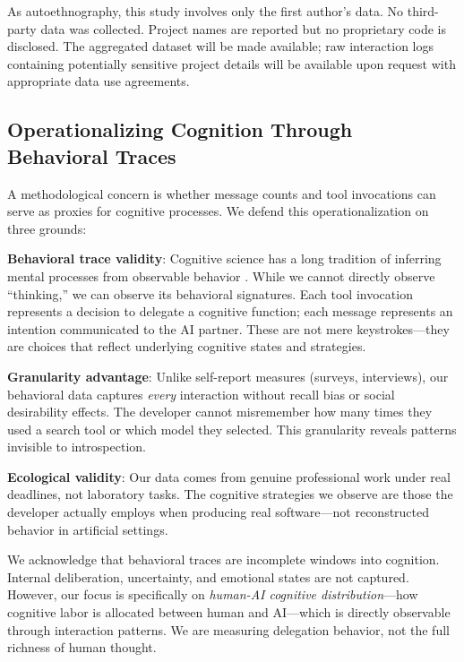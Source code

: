 As autoethnography, this study involves only the first author's data. No third-party data was collected. Project names are reported but no proprietary code is disclosed. The aggregated dataset will be made available; raw interaction logs containing potentially sensitive project details will be available upon request with appropriate data use agreements.

\subsection{Operationalizing Cognition Through Behavioral Traces}

A methodological concern is whether message counts and tool invocations can serve as proxies for cognitive processes. We defend this operationalization on three grounds:

\textbf{Behavioral trace validity}: Cognitive science has a long tradition of inferring mental processes from observable behavior \cite{letovsky1987cognitive}. While we cannot directly observe ``thinking,'' we can observe its behavioral signatures. Each tool invocation represents a decision to delegate a cognitive function; each message represents an intention communicated to the AI partner. These are not mere keystrokes---they are choices that reflect underlying cognitive states and strategies.

\textbf{Granularity advantage}: Unlike self-report measures (surveys, interviews), our behavioral data captures \textit{every} interaction without recall bias or social desirability effects. The developer cannot misremember how many times they used a search tool or which model they selected. This granularity reveals patterns invisible to introspection.

\textbf{Ecological validity}: Our data comes from genuine professional work under real deadlines, not laboratory tasks. The cognitive strategies we observe are those the developer actually employs when producing real software---not reconstructed behavior in artificial settings.

We acknowledge that behavioral traces are incomplete windows into cognition. Internal deliberation, uncertainty, and emotional states are not captured. However, our focus is specifically on \textit{human-AI cognitive distribution}---how cognitive labor is allocated between human and AI---which is directly observable through interaction patterns. We are measuring delegation behavior, not the full richness of human thought.

